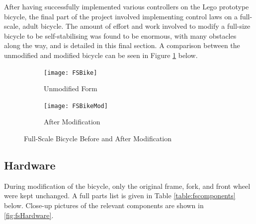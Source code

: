 After having successfully implemented various controllers on the Lego prototype bicycle, the final part of the project involved implementing control laws on a full-scale, adult bicycle. The amount of effort and work involved to modify a full-size bicycle to be self-stabilising was found to be enormous, with many obstacles along the way, and is detailed in this final section. A comparison between the unmodified and modified bicycle can be seen in Figure \ref{fig:fsvsfsmod} below.

\begin{figure}[H]
	\begin{subfigure}{0.475\textwidth}
	\texttt{[image: FSBike]}
	\caption{Unmodified Form}
	\end{subfigure} \hfill
	\begin{subfigure}{0.475\textwidth}
	\texttt{[image: FSBikeMod]}
	\caption{After Modification}
	\end{subfigure}
	\caption{Full-Scale Bicycle Before and After Modification}
	\label{fig:fsvsfsmod}
\end{figure}

\subsection{Hardware}
During modification of the bicycle, only the original frame, fork, and front wheel were kept unchanged. A full parts list is given in Table \ref{table:fscomponents} below. Close-up pictures of the relevant components are shown in \ref{fig:fsHardware}.

